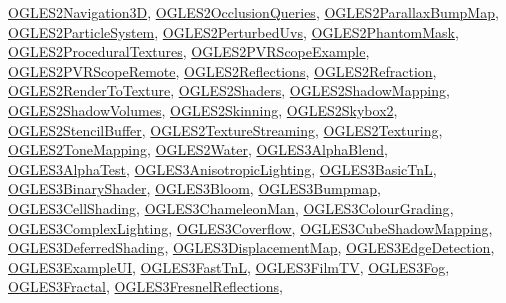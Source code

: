 \hyperlink{class_o_g_l_e_s2_navigation3_d}{O\+G\+L\+E\+S2\+Navigation3\+D}, \hyperlink{class_o_g_l_e_s2_occlusion_queries}{O\+G\+L\+E\+S2\+Occlusion\+Queries}, \hyperlink{class_o_g_l_e_s2_parallax_bump_map}{O\+G\+L\+E\+S2\+Parallax\+Bump\+Map}, \hyperlink{class_o_g_l_e_s2_particle_system}{O\+G\+L\+E\+S2\+Particle\+System}, \hyperlink{class_o_g_l_e_s2_perturbed_uvs}{O\+G\+L\+E\+S2\+Perturbed\+Uvs}, \hyperlink{class_o_g_l_e_s2_phantom_mask}{O\+G\+L\+E\+S2\+Phantom\+Mask}, \hyperlink{class_o_g_l_e_s2_procedural_textures}{O\+G\+L\+E\+S2\+Procedural\+Textures}, \hyperlink{class_o_g_l_e_s2_p_v_r_scope_example}{O\+G\+L\+E\+S2\+P\+V\+R\+Scope\+Example}, \hyperlink{class_o_g_l_e_s2_p_v_r_scope_remote}{O\+G\+L\+E\+S2\+P\+V\+R\+Scope\+Remote}, \hyperlink{class_o_g_l_e_s2_reflections}{O\+G\+L\+E\+S2\+Reflections}, \hyperlink{class_o_g_l_e_s2_refraction}{O\+G\+L\+E\+S2\+Refraction}, \hyperlink{class_o_g_l_e_s2_render_to_texture}{O\+G\+L\+E\+S2\+Render\+To\+Texture}, \hyperlink{class_o_g_l_e_s2_shaders}{O\+G\+L\+E\+S2\+Shaders}, \hyperlink{class_o_g_l_e_s2_shadow_mapping}{O\+G\+L\+E\+S2\+Shadow\+Mapping}, \hyperlink{class_o_g_l_e_s2_shadow_volumes}{O\+G\+L\+E\+S2\+Shadow\+Volumes}, \hyperlink{class_o_g_l_e_s2_skinning}{O\+G\+L\+E\+S2\+Skinning}, \hyperlink{class_o_g_l_e_s2_skybox2}{O\+G\+L\+E\+S2\+Skybox2}, \hyperlink{class_o_g_l_e_s2_stencil_buffer}{O\+G\+L\+E\+S2\+Stencil\+Buffer}, \hyperlink{class_o_g_l_e_s2_texture_streaming}{O\+G\+L\+E\+S2\+Texture\+Streaming}, \hyperlink{class_o_g_l_e_s2_texturing}{O\+G\+L\+E\+S2\+Texturing}, \hyperlink{class_o_g_l_e_s2_tone_mapping}{O\+G\+L\+E\+S2\+Tone\+Mapping}, \hyperlink{class_o_g_l_e_s2_water}{O\+G\+L\+E\+S2\+Water}, \hyperlink{class_o_g_l_e_s3_alpha_blend}{O\+G\+L\+E\+S3\+Alpha\+Blend}, \hyperlink{class_o_g_l_e_s3_alpha_test}{O\+G\+L\+E\+S3\+Alpha\+Test}, \hyperlink{class_o_g_l_e_s3_anisotropic_lighting}{O\+G\+L\+E\+S3\+Anisotropic\+Lighting}, \hyperlink{class_o_g_l_e_s3_basic_tn_l}{O\+G\+L\+E\+S3\+Basic\+Tn\+L}, \hyperlink{class_o_g_l_e_s3_binary_shader}{O\+G\+L\+E\+S3\+Binary\+Shader}, \hyperlink{class_o_g_l_e_s3_bloom}{O\+G\+L\+E\+S3\+Bloom}, \hyperlink{class_o_g_l_e_s3_bumpmap}{O\+G\+L\+E\+S3\+Bumpmap}, \hyperlink{class_o_g_l_e_s3_cell_shading}{O\+G\+L\+E\+S3\+Cell\+Shading}, \hyperlink{class_o_g_l_e_s3_chameleon_man}{O\+G\+L\+E\+S3\+Chameleon\+Man}, \hyperlink{class_o_g_l_e_s3_colour_grading}{O\+G\+L\+E\+S3\+Colour\+Grading}, \hyperlink{class_o_g_l_e_s3_complex_lighting}{O\+G\+L\+E\+S3\+Complex\+Lighting}, \hyperlink{class_o_g_l_e_s3_coverflow}{O\+G\+L\+E\+S3\+Coverflow}, \hyperlink{class_o_g_l_e_s3_cube_shadow_mapping}{O\+G\+L\+E\+S3\+Cube\+Shadow\+Mapping}, \hyperlink{class_o_g_l_e_s3_deferred_shading}{O\+G\+L\+E\+S3\+Deferred\+Shading}, \hyperlink{class_o_g_l_e_s3_displacement_map}{O\+G\+L\+E\+S3\+Displacement\+Map}, \hyperlink{class_o_g_l_e_s3_edge_detection}{O\+G\+L\+E\+S3\+Edge\+Detection}, \hyperlink{class_o_g_l_e_s3_example_u_i}{O\+G\+L\+E\+S3\+Example\+U\+I}, \hyperlink{class_o_g_l_e_s3_fast_tn_l}{O\+G\+L\+E\+S3\+Fast\+Tn\+L}, \hyperlink{class_o_g_l_e_s3_film_t_v}{O\+G\+L\+E\+S3\+Film\+T\+V}, \hyperlink{class_o_g_l_e_s3_fog}{O\+G\+L\+E\+S3\+Fog}, \hyperlink{class_o_g_l_e_s3_fractal}{O\+G\+L\+E\+S3\+Fractal}, \hyperlink{class_o_g_l_e_s3_fresnel_reflections}{O\+G\+L\+E\+S3\+Fresnel\+Reflections}, 